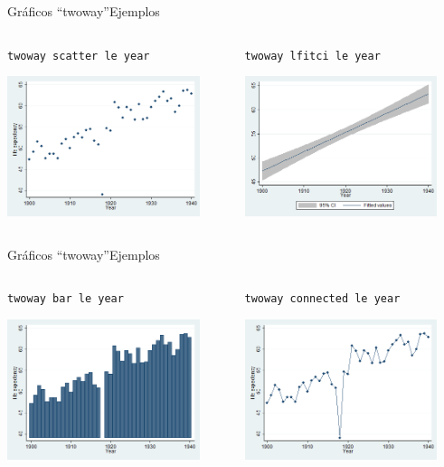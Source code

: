 \documentclass{beamer}
\begin{document}
\begin{frame}{Gráficos ``twoway''}{Ejemplos}
\begin{columns}
\begin{column}{5cm}
{\footnotesize 
\texttt{twoway scatter le year}}\\\medskip
\centerline{\includegraphics[height=4.1cm]{twscatter.png}}
\end{column}
\begin{column}{5cm}
{\footnotesize 
\texttt{twoway lfitci le year}}\\\medskip
\centerline{\includegraphics[height=4.1cm]{twlf.png}}
\end{column}
\end{columns}
\end{frame}


\begin{frame}{Gráficos ``twoway''}{Ejemplos}
\begin{columns}
\begin{column}{5cm}
{\footnotesize 
\texttt{twoway bar le year}}\\\medskip
\centerline{\includegraphics[height=4.1cm]{twbar.png}}
\end{column}
\begin{column}{5cm}
{\footnotesize 
\texttt{twoway connected le year}}\\\medskip
\centerline{\includegraphics[height=4.1cm]{twcon.png}}
\end{column}
\end{columns}
\end{frame}
\end{document}
